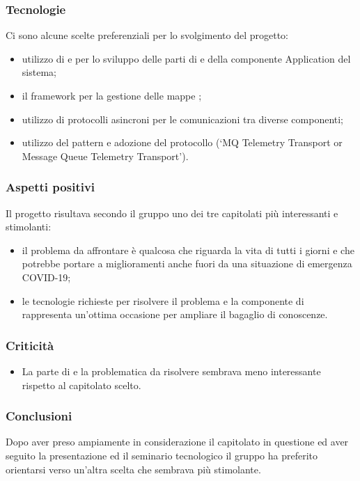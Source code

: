 \documentclass[]{article}
\begin{document}
		\subsubsection{Tecnologie}
		Ci sono alcune scelte preferenziali per lo svolgimento del progetto:
		\begin{itemize}
		\item utilizzo di  e  per lo sviluppo delle parti di  e  della componente Application del sistema;
		\item il framework  per la gestione delle mappe ;
		\item utilizzo di protocolli asincroni per le comunicazioni tra diverse componenti;
		\item utilizzo del pattern  e adozione del protocollo (‘MQ Telemetry Transport or Message Queue Telemetry Transport’).
		\end{itemize}

		\subsubsection{Aspetti positivi}
		Il progetto risultava secondo il gruppo uno dei tre capitolati più interessanti e stimolanti:
		\begin{itemize}
		\item il problema da affrontare è qualcosa che riguarda la vita di tutti i giorni e che potrebbe portare a miglioramenti anche fuori da una situazione di emergenza COVID-19;
		\item le tecnologie richieste per risolvere il problema e la componente di  rappresenta un’ottima occasione per ampliare il bagaglio di conoscenze.
		\end{itemize}

		\subsubsection{Criticità}
		\begin{itemize}
		\item La parte di  e la problematica da risolvere sembrava meno interessante rispetto al capitolato scelto.
		\end{itemize}

		\subsubsection{Conclusioni}
		Dopo aver preso ampiamente in considerazione il capitolato in questione ed aver seguito la presentazione ed il seminario tecnologico il gruppo ha preferito orientarsi verso un’altra scelta che sembrava più stimolante.
\end{document}
